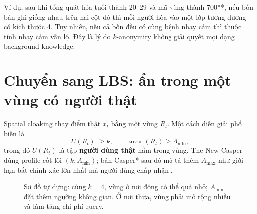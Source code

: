 \documentclass[11pt,a4paper,oneside]{report}
\begin{document}
Ví dụ, sau khi tổng quát hóa tuổi thành 20--29 và mã vùng thành 700**, nếu bốn bản
ghi giống nhau trên hai cột đó thì mỗi người hòa vào một lớp tương đương có kích
thước 4. Tuy nhiên, nếu cả bốn đều có cùng bệnh nhạy cảm thì thuộc tính nhạy cảm
vẫn lộ. Đây là lý do $k$-anonymity không giải quyết mọi dạng background knowledge.

\section{Chuyển sang LBS: ẩn trong một vùng có người thật}

Spatial cloaking thay điểm thật $x_t$ bằng một vùng $R_t$. Một cách diễn giải phổ
biến là
\[
|U(R_t)|\ge k,
\qquad
\operatorname{area}(R_t)\ge A_{\min},
\]
trong đó $U(R_t)$ là tập \textbf{người dùng thật} nằm trong vùng. The New Casper
dùng profile cốt lõi $(k,A_{\min})$; bản Casper* sau đó mô tả thêm $A_{\max}$ như
giới hạn bất chính xác lớn nhất mà người dùng chấp nhận
\cite{mokbel2006casper,chow2009casper}.

\begin{figure}[htbp]
\centering
{}
\caption{Sơ đồ tự dựng: cùng $k=4$, vùng ở nơi đông có thể quá nhỏ; $A_{\min}$ đặt thêm ngưỡng không gian. Ở nơi thưa, vùng phải mở rộng nhiều và làm tăng chi phí query.}
\label{fig:k-area}
\end{figure}
\end{document}
